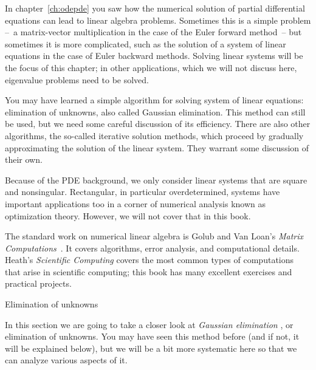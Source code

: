 
In chapter~\ref{ch:odepde} you saw how the numerical solution of
partial differential equations can lead to linear algebra
problems. Sometimes this is a simple problem --~a matrix-vector
multiplication in the case of the Euler forward method~-- but
sometimes it is more complicated, such as the solution of a system of
linear equations in the case of Euler backward methods. Solving linear
systems will be the focus of this chapter; in other applications,
which we will not discuss here, eigenvalue problems need to be solved.

You may have learned a simple
algorithm for solving system of linear equations: elimination of
unknowns, also called Gaussian elimination. This method can still be
used, but we need some careful discussion of its efficiency. There are
also other algorithms, the so-called iterative solution methods, which
proceed by gradually approximating the solution of the linear
system. They warrant some discussion of their own.

Because of the PDE background, we only consider linear systems that
are square and nonsingular. Rectangular, in particular overdetermined,
systems have important applications too in a corner of numerical
analysis known as optimization theory. However, we will not cover
that in this book.

The standard work on numerical linear algebra is Golub and Van Loan's
{\it Matrix Computations}~\cite{GoVL:matcomp}.  It covers algorithms,
error analysis, and computational details.  Heath's {\it Scientific
  Computing} covers the most common types of computations that arise
in scientific computing; this book has many excellent exercises and
practical projects.

 {Elimination of unknowns}
\label{sec:gauss-example}

In this section we are going to take a closer look at
\emph{Gaussian elimination}%
,
or elimination of unknowns. You may have seen this method
before (and if not, it will be explained below), but we will be a bit
more systematic here so that we can analyze various aspects of it.

